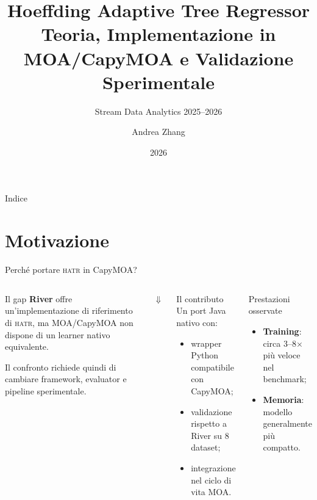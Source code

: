 \documentclass[aspectratio=169,10pt]{beamer}
\title[\hatr{} — Porting e Validazione]{%
  Hoeffding Adaptive Tree Regressor\\
  Teoria, Implementazione in MOA/CapyMOA e Validazione Sperimentale}
\subtitle{Stream Data Analytics 2025--2026}
\author[Andrea Zhang]{Andrea Zhang}
\institute[Polimi]{Politecnico di Milano}
\date{2026}
\newcommand{\hatr}{\textsc{hatr}}
\newcommand{\river}{\textcolor{riverblue}{\textbf{River}}}
\begin{document}
\begin{frame}
  \titlepage
\end{frame}

\begin{frame}{Indice}
  \tableofcontents[hideallsubsections]
\end{frame}

\section{Motivazione}

\begin{frame}{Perché portare \hatr{} in CapyMOA?}
  \begin{columns}[T]
    \begin{alertblock}{Il gap}
      \small
      \river{} offre un'implementazione di riferimento di \hatr{},
      ma MOA/CapyMOA non dispone di un learner nativo equivalente.

      \smallskip
      Il confronto richiede quindi di cambiare framework, evaluator
      e pipeline sperimentale.
    \end{alertblock}

    \vspace{-2pt}
    \begin{center}
      \Large\textcolor{riverblue}{$\Downarrow$}
    \end{center}
    \vspace{-6pt}

    \begin{block}{Il contributo}
      \small
      Un port Java nativo con:
      \begin{itemize}
        \item wrapper Python compatibile con CapyMOA;
        \item validazione rispetto a River su 8 dataset;
        \item integrazione nel ciclo di vita MOA.
      \end{itemize}
    \end{block}

    \begin{block}{Prestazioni osservate}
      \small
      \begin{itemize}
        \item \textbf{Training}: circa 3--8$\times$ più veloce nel benchmark;
        \item \textbf{Memoria}: modello generalmente più compatto.
      \end{itemize}
    \end{block}


\end{columns}
\end{frame}
\end{document}

